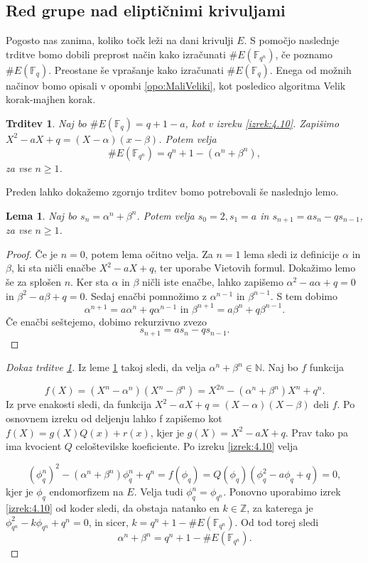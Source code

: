 \documentclass[12pt,a4paper,twoside]{article}
\theoremstyle{definition} %
\theoremstyle{plain} %
\newtheorem{lema}[definicija]{Lema}
\newtheorem{trditev}[definicija]{Trditev}
\numberwithin{equation}{section}  %
\newcommand{\N}{\mathbb N}
\newcommand{\Z}{\mathbb Z}
\newcommand{\F}{\mathbb F}
\newcommand{\E}[1]{E({#1})}
\begin{document}
\subsection{Red grupe nad eliptičnimi krivuljami}


Pogosto nas zanima, koliko točk leži na dani krivulji $E$. S pomočjo naslednje trditve bomo dobili preprost način kako izračunati $\# \E{\F_{q^n}}$, če poznamo $\# \E{\F_q}$.
Preostane še vprašanje kako izračunati $\# \E{\F_q}$. Enega od možnih načinov bomo opisali v opombi \ref{opo:MaliVeliki}, kot posledico algoritma Velik korak-majhen korak.




\begin{trditev}
\label{trd:4.12}
Naj bo $\# \E{\F_q} = q+1-a$, kot v izreku \ref{izrek:4.10}. Zapišimo $X^2-aX+q = (X-\alpha)(x-\beta)$. Potem velja
$$\# \E{\F_{q^{n}}} = q^n+1-(\alpha^n+\beta^n),$$
za vse $n \geq 1$.

\end{trditev}

Preden lahko dokažemo zgornjo trditev bomo potrebovali še naslednjo lemo.

\begin{lema}
\label{lema:4.13}
Naj bo $s_n = \alpha^n +  \beta^n$. Potem velja $s_0 = 2,s_1 = a$ in $ s_{n+1} = as_n-qs_{n-1}$, za vse $n \geq 1$.

\end{lema}

\begin{proof}
Če je $n = 0$, potem lema očitno velja. Za $n=1$ lema sledi iz definicije $\alpha$ in $\beta$, ki sta ničli enačbe $X^2-aX+q$, ter uporabe Vietovih formul. Dokažimo lemo še za splošen $n$.
Ker sta $\alpha$ in $\beta$ ničli iste enačbe, lahko zapišemo $\alpha^2-a\alpha +q = 0$ in $\beta^2-a\beta+q=0$. Sedaj enačbi pomnožimo z $\alpha^{n-1}$ in $\beta^{n-1}$. S tem dobimo
$$\alpha^{n+1} = a\alpha^n +q\alpha^{n-1}\text{ in } \beta^{n+1} = a\beta^n +q\beta^{n-1}.$$
Če enačbi seštejemo, dobimo rekurzivno zvezo
$$s_{n+1} = as_n-qs_{n-1}.$$
\end{proof}

\begin{proof}[Dokaz trditve \ref{trd:4.12}]
Iz leme \ref{lema:4.13} takoj sledi, da velja $\alpha^n+\beta^n \in \N$. Naj bo $f$ funkcija

$$f(X) = (X^n-\alpha^n)(X^n-\beta^n) = X^{2n}-(\alpha^n+\beta^n)X^n+q^n.$$
Iz prve enakosti sledi, da funkcija $X^2-aX+q = (X-\alpha)(X-\beta)$ deli $f$. Po osnovnem izreku od deljenju lahko f zapišemo kot $f(X) = g(X)Q(x)+r(x)$, kjer je $g(X)= X^2-aX+q$. Prav tako pa ima kvocient $Q$ celoštevilske koeficiente. Po izreku \ref{izrek:4.10} velja

$$(\phi^n_q)^2 -(\alpha^n+\beta^n)\phi^n_q + q^n = f(\phi_q) = Q(\phi_q)(\phi^2_q-a\phi_q+q) = 0,$$
kjer je $\phi_q$ endomorfizem na $E$. Velja tudi $\phi^n_q = \phi_{q^n}$. Ponovno uporabimo izrek \ref{izrek:4.10} od koder sledi, da obstaja natanko en $k \in \Z$, za katerega je
$\phi^2_{q^n}-k\phi_{q^n}+q^n=0$, in sicer, $k = q^n+1-\#\E{\F_{q^n}}$. Od tod torej sledi
$$\alpha^n+\beta^n = q^n+1-\#\E{\F_{q^n}}.$$

\end{proof}
\end{document}
